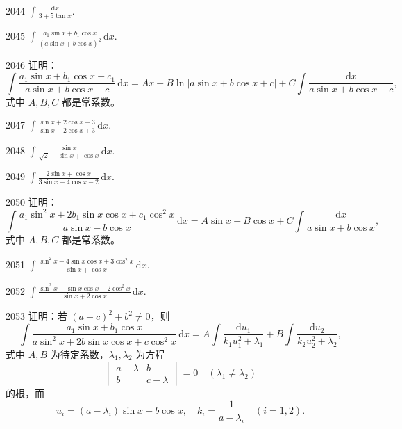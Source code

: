 \begin{prob}[S]{2044}
$\int \frac{\mathrm{d}x}{3 + 5\tan x}$.
\end{prob}

\begin{prob}[S]{2045}
$\int \frac{a_1 \sin x + b_1 \cos x}{(a\sin x + b\cos x)^2}\,\mathrm{d}x$.
\end{prob}

\begin{prob}[M]{2046}
证明：
\[
\int \frac{a_1 \sin x + b_1 \cos x + c_1}{a\sin x + b\cos x + c}\,\mathrm{d}x = Ax + B\ln |a\sin x + b\cos x + c| + C\int \frac{\mathrm{d}x}{a\sin x + b\cos x + c},
\]
式中 $A, B, C$ 都是常系数。
\end{prob}


\begin{prob}[S]{2047}
$\int \frac{\sin x + 2\cos x - 3}{\sin x - 2\cos x + 3}\,\mathrm{d}x$.
\end{prob}

\begin{prob}[S]{2048}
$\int \frac{\sin x}{\sqrt{2} + \sin x + \cos x}\,\mathrm{d}x$.
\end{prob}

\begin{prob}[S]{2049}
$\int \frac{2\sin x + \cos x}{3\sin x + 4\cos x - 2}\,\mathrm{d}x$.
\end{prob}

\begin{prob}[M]{2050}
证明：
\[
\int \frac{a_1 \sin^2 x + 2b_1 \sin x \cos x + c_1 \cos^2 x}{a\sin x + b\cos x}\,\mathrm{d}x = A\sin x + B\cos x + C\int \frac{\mathrm{d}x}{a\sin x + b\cos x},
\]
式中 $A, B, C$ 都是常系数。
\end{prob}


\begin{prob}[S]{2051}
$\int \frac{\sin^2 x - 4\sin x \cos x + 3\cos^2 x}{\sin x + \cos x}\,\mathrm{d}x$.
\end{prob}

\begin{prob}[S]{2052}
$\int \frac{\sin^2 x - \sin x \cos x + 2\cos^2 x}{\sin x + 2\cos x}\,\mathrm{d}x$.
\end{prob}

\begin{prob}[M]{2053}
证明：若 $(a - c)^2 + b^2 \neq 0$，则
\[
\int \frac{a_1 \sin x + b_1 \cos x}{a\sin^2 x + 2b\sin x \cos x + c\cos^2 x}\,\mathrm{d}x = A\int \frac{\mathrm{d}u_1}{k_1 u_1^2 + \lambda_1} + B\int \frac{\mathrm{d}u_2}{k_2 u_2^2 + \lambda_2},
\]
式中 $A, B$ 为待定系数，$\lambda_1, \lambda_2$ 为方程
\[
\begin{vmatrix}
a - \lambda & b \\
b & c - \lambda
\end{vmatrix} = 0 \quad (\lambda_1 \neq \lambda_2)
\]
的根，而
\[
u_i = (a - \lambda_i)\sin x + b\cos x, \quad k_i = \frac{1}{a - \lambda_i} \quad (i = 1, 2).
\]
\end{prob}

